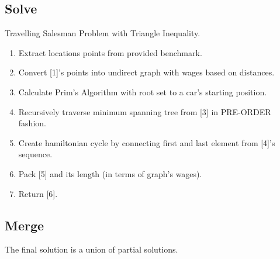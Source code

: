 \documentclass{article}
\begin{document}
	
\subsection{Solve}
Travelling Salesman Problem with Triangle Inequality.
	\begin{enumerate}
		\item Extract locations points from provided benchmark.
		\item Convert [1]'s points into undirect graph with wages based on distances.
		\item Calculate Prim's Algorithm with root set to a car's starting position.
		\item Recursively traverse minimum spanning tree from [3] in PRE-ORDER fashion.
		\item Create hamiltonian cycle by connecting first and last element from [4]'s sequence.
		\item Pack [5] and its length (in terms of graph's wages).
		\item Return [6].
	\end{enumerate}	

\subsection{Merge}
The final solution is a union of partial solutions.
	
\end{document}
